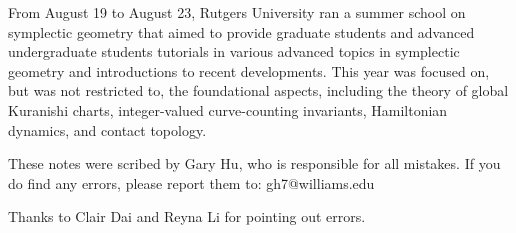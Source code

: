 %
%


From August 19 to August 23, Rutgers University ran a summer school on symplectic geometry that aimed to provide graduate students and advanced undergraduate students tutorials in various advanced topics in symplectic geometry and introductions to recent developments. This year was focused on, but was not restricted to, the foundational aspects, including the theory of global Kuranishi charts, integer-valued curve-counting invariants, Hamiltonian dynamics, and contact topology.

These notes were scribed by Gary Hu, who is responsible for all mistakes. If you do find any errors, please report them to: gh7@williams.edu

Thanks to Clair Dai and Reyna Li for pointing out errors.